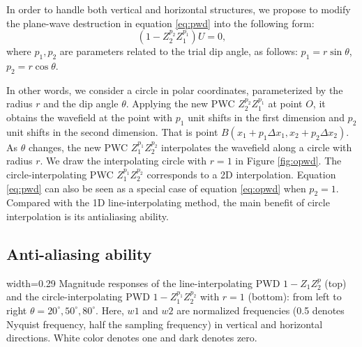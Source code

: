 In order to handle both vertical and horizontal structures, 
we propose to modify
the plane-wave destruction in equation \ref{eq:pwd}
into the following form:
\begin{equation}\label{eq:opwd}
(1-Z_2^{p_2}Z_1^{p_1})U=0,
\end{equation}
where
$p_1,p_2$ are parameters related to the trial dip angle, as follows:
$p_1=r\sin \theta$, %
$p_2=r\cos \theta$.


In other words, 
we consider a circle in polar coordinates,
parameterized by the radius $r$ and the dip angle $\theta$.
Applying the new PWC $Z_2^{p_2}Z_1^{p_1}$ at point $O$, 
it obtains the wavefield at the point with 
$p_1$ unit shifts in the first dimension and
$p_2$ unit shifts in the second dimension.
That is point $B(x_1+p_1\Delta x_1,x_2+p_2\Delta x_2)$.
As $\theta$ changes,
the new PWC $Z_1^{p_1}Z_2^{p_2}$ interpolates the wavefield
along a circle with radius $r$.
We draw the interpolating circle with $r=1$ in Figure \ref{fig:opwd}.
The circle-interpolating PWC $Z_1^{p_1}Z_2^{p_2}$ 
corresponds to a 2D interpolation.
Equation \ref{eq:pwd} can also be seen as 
a special case of equation \ref{eq:opwd} when $p_2=1$.
Compared with the 1D line-interpolating method,
the main benefit of circle interpolation 
is its antialiasing ability.

\subsection{Anti-aliasing ability}


{width=0.29\textwidth}{
Magnitude responses of the line-interpolating PWD $1-Z_1Z_2^p$ (top)
and the circle-interpolating PWD 
$1-Z_1^{p_1}Z_2^{p_2}$ with $r=1$ (bottom):
from left to right $\theta=20^\circ,50^\circ,80^\circ$.
Here, $w1$ and $w2$ are normalized frequencies
(0.5 denotes Nyquist frequency, half the sampling frequency)
in vertical and horizontal directions.
White color denotes one and dark denotes zero.
}

